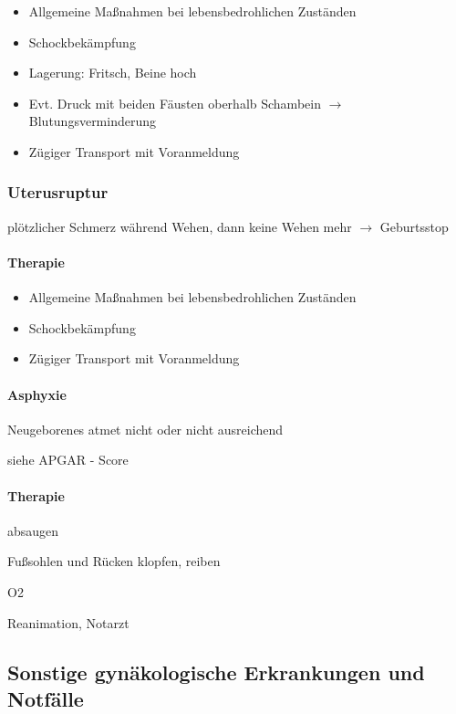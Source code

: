 \begin{itemize}
    \item Allgemeine Ma{\ss}nahmen bei lebensbedrohlichen Zuständen
    \item Schockbekämpfung
    \item Lagerung: Fritsch, Beine hoch
    \item Evt. Druck mit beiden Fäusten oberhalb  Schambein ${\rightarrow}$
    Blutungsverminderung
    \item Z\"ugiger Transport mit Voranmeldung
\end{itemize}


\subsubsection{Uterusruptur}
{\mdseries
plötzlicher Schmerz während Wehen,  dann keine Wehen mehr
${\rightarrow}$ Geburtsstop}


\paragraph{Therapie}

\begin{itemize}
    \item Allgemeine Ma{\ss}nahmen bei lebensbedrohlichen Zuständen
    \item Schockbekämpfung
    \item Z\"ugiger Transport mit Voranmeldung
\end{itemize}

\paragraph{Asphyxie}

Neugeborenes atmet nicht oder nicht  ausreichend

siehe APGAR - Score

\paragraph{Therapie}

absaugen

Fu{\ss}sohlen und R\"ucken klopfen, reiben

O2

Reanimation, Notarzt


\subsection{Sonstige gynäkologische Erkrankungen und
Notfälle}

